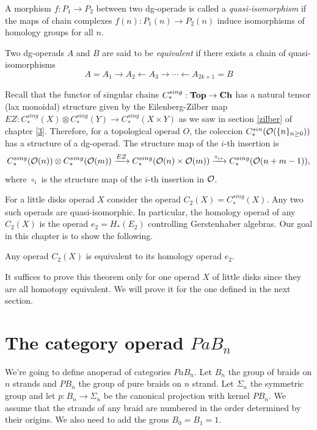 \documentclass[TFM.tex]{subfiles}
\begin{document}
\begin{defi}
A morphism $f : P_1→P_2$ between two dg-operads is called a
\emph{quasi-isomorphism} if the maps of chain complexes $f(n) : P_1(n)→P_2(n)$ induce isomorphisms of
homology groups for all $n$.
\end{defi}

\begin{defi}
Two dg-operads $A$ and $B$ are said to be \emph{equivalent} if there exists a chain of quasi-isomorphisms
\[
A= A_1→A_2←A_3→\cdots←A_{2k+1} = B
\]
\end{defi}

Recall that the functor of singular chains $C_*^{sing}:\mathrm{\mathbf{Top}}\to \mathrm{\mathbf{Ch}}$ has a natural tensor (lax monoidal) structure given by the Eilenberg-Zilber map $EZ:C_*^{sing}(X)\otimes C_*^{sing}(Y)\to C_*^{sing}(X\times Y)$ as we saw in section \ref{zilber} of chapter \ref{3}. Therefore, for a topological operad $O$, the coleccion $C_*^{sin}({\mathcal O}(\{n\}_{n\geq 0}))$ has a structure of a dg-operad. The structure map of the $i$-th insertion is 
\[
C_*^{sing}({\mathcal O}(n))\otimes C_*^{sing}({\mathcal O}(m))\xrightarrow{EZ} C_*^{sing}({\mathcal O}(n)\times {\mathcal O}(m))\xrightarrow{\circ_{i*}} C_*^{sing}({\mathcal O}(n+m-1)),
\]
where $\circ_i$ is the structure map of the $i$-th insertion in ${\mathcal O}$. 

For a little disks operad $X$ consider the operad $C_2(X)=C_*^{sing}(X)$. Any two such operads are quasi-isomorphic. In particular, the homology operad of any $C_2(X)$ is the operad $e_2=H_*(E_2)$ controlling Gerstenhaber algebras. Our goal in this chapter is to show the following.

\begin{thm}
Any operad $C_2(X)$ is equivalent to its homology operad $e_2$.
\end{thm}

It suffices to prove this theorem only for one operad $X$ of little disks since they are all homotopy equivalent. We will prove it for the one defined in the next section.

\section{The category operad $PaB_n$}\label{pab}

We're going to define anoperad of categories $PaB_n$. Let $B_n$ the group of braids on $n$ strands and $PB_n$ the group of pure braids on $n$ strand. Let $\Sigma_n$ the symmetric group and let $p:B_n\to \Sigma_n$ be the canonical projection with kernel $PB_n$. We assume that the strands of any braid are numbered in the order determined by their origins. We also need to add the grous $B_0=B_1=1$.
\end{document}
